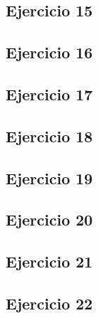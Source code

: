 \documentclass[10pt,a4paper]{article}
\begin{document}
  \subsection{Ejercicio 15}
  \subsection{Ejercicio 16}
  \subsection{Ejercicio 17}
  \subsection{Ejercicio 18}
  \subsection{Ejercicio 19}
  \subsection{Ejercicio 20}
  \subsection{Ejercicio 21}
  \subsection{Ejercicio 22}
\end{document}
